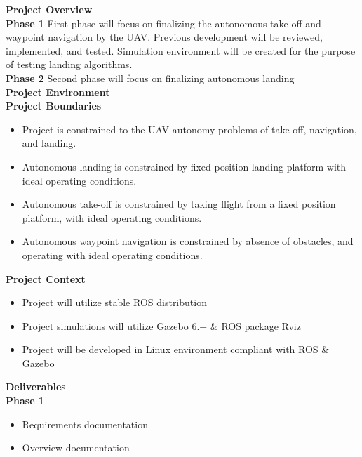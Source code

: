 \vspace{6mm}
\Large{\textbf{Project Overview}}
\\[-3mm]\noindent\makebox[\linewidth]{\rule{\textwidth}{0.4pt}}
\normalsize{\textbf{Phase 1}}
First phase will focus on finalizing the autonomous take-off and waypoint navigation by the UAV. Previous development will be reviewed, implemented, and tested. Simulation environment will be created for the purpose of testing landing algorithms. 
\\[3mm]
\normalsize{\textbf{Phase 2}}
Second phase will focus on finalizing autonomous landing
\\[10mm]
\Large{\textbf{Project Environment}}
\\[-3mm]\noindent\makebox[\linewidth]{\rule{\textwidth}{0.4pt}}
\normalsize{\textbf{Project Boundaries}}
\begin{itemize}
\item Project is constrained to the UAV autonomy problems of take-off, navigation, and landing. 
\item Autonomous landing is constrained by fixed position landing platform with ideal operating conditions.
\item Autonomous take-off is constrained by taking flight from a fixed position platform, with ideal operating conditions.
\item Autonomous waypoint navigation is constrained by absence of obstacles, and operating with ideal operating conditions.
\end{itemize}
\vspace{3mm}
\normalsize{\textbf{Project Context}}
\begin{itemize}
\item Project will utilize stable ROS distribution
\item Project simulations will utilize Gazebo 6.+ \& ROS package Rviz
\item Project will be developed in Linux environment compliant with ROS \& Gazebo 
\end{itemize}
\vspace{6mm}
\Large{\textbf{Deliverables}}
\\[-3mm]\noindent\makebox[\linewidth]{\rule{\textwidth}{0.4pt}}
\normalsize{\textbf{Phase 1}}
\begin{itemize}
\item Requirements documentation
\item Overview documentation
\end{itemize}
\vspace{3mm}
